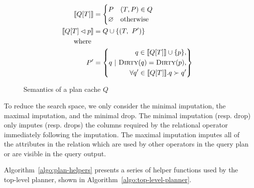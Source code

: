 \begin{figure}
  \begin{align*}
    \llbracket Q[T] \rrbracket &= \begin{cases}
      P & (T, P) \in Q \\
      \varnothing & \text{otherwise} \\
    \end{cases} \\
    \llbracket Q[T] \lhd p \rrbracket &= \begin{aligned} Q \cup \{(T,\ P') \} \end{aligned}\\
                                            \text{ where } \\
                                           P' &= \left\{q ~|~ \begin{aligned}
                                                                     q \in \llbracket Q[T] \rrbracket \cup \{p\}, \\
                                                                     \textsc{Dirty}(q) = \textsc{Dirty}(p),\\
                                                                     \forall q' \in \llbracket Q[T] \rrbracket.  q \succ q' 
                                                                   \end{aligned}
                                           \right\}
  \end{align*}
  \caption{Semantics of a plan cache $Q$}
  \label{fig:semantics-plan-cache}
\end{figure}

To reduce the search space, we only consider the minimal imputation, the maximal imputation, and the minimal drop. The minimal imputation (resp. drop) only imputes (resp. drops) the columns required by the relational operator immediately following the imputation. The maximal imputation imputes all of the attributes in the relation which are used by other operators in the query plan or are visible in the query output.

Algorithm~\ref{algo:plan-helpers} presents a series of helper functions used by the top-level planner, shown in Algorithm~\ref{algo:top-level-planner}.

